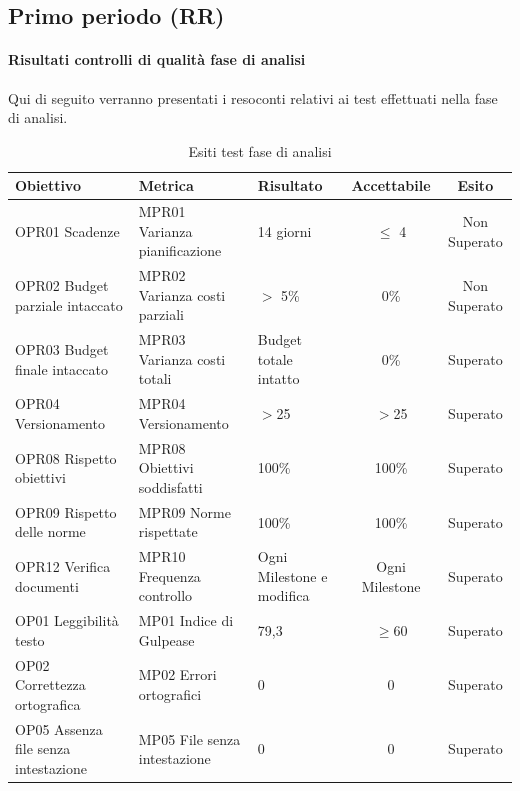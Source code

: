 \documentclass[../piano_di_qualifica.tex]{subfiles}
\begin{document}
\subsection{Primo periodo (RR)}
\label{sub:periodo-RR}
\paragraph{Risultati controlli di qualità fase di analisi}
Qui di seguito verranno presentati i resoconti relativi ai test effettuati nella fase di analisi. \par

\begin{table}[!ht]
	\centering
	\begin{tabular}{|p{4cm}|p{4cm}|l|c|c|}
		\hline
		\rowcolor{lightgray}
		\textbf{Obiettivo}            			& \textbf{Metrica}              & \textbf{Risultato}                    & \textbf{Accettabile} & \textbf{Esito} \\
		\hline
		OPR01 Scadenze		        			& MPR01 Varianza pianificazione & 14 giorni                             & $\leq$ 4           & Non Superato   \\
		OPR02 Budget parziale intaccato        	& MPR02 Varianza costi parziali & $>$ 5\%								& 0\%                  & Non Superato   \\
		OPR03 Budget finale intaccato        	& MPR03 Varianza costi totali   & Budget totale intatto					& 0\%                  & Superato       \\
		OPR04 Versionamento						& MPR04 Versionamento			& $>$25									&$>$25					& Superato	\\
		OPR08 Rispetto obiettivi      			& MPR08 Obiettivi soddisfatti   & 100\%                                 & 100\%                & Superato       \\
		OPR09 Rispetto delle norme   			& MPR09 Norme rispettate        & 100\%                                 & 100\%                & Superato       \\
		OPR12 Verifica documenti      			& MPR10 Frequenza controllo     & Ogni Milestone e modifica         	& Ogni Milestone       & Superato       \\
		OP01 Leggibilità testo       			& MP01 Indice di Gulpease      & 79,3                                  & \(\ge 60\)           & Superato       \\
		OP02 Correttezza ortografica 			& MP02 Errori ortografici      & 0                                     & 0                    & Superato       \\
		OP05 Assenza file senza intestazione	& MP05 File senza intestazione 	& 0										& 0						& Superato		\\
		\hline
	\end{tabular}
	\caption{Esiti test fase di analisi}
\end{table}
\end{document}
